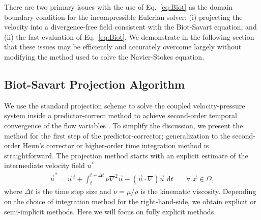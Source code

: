 \documentclass[11pt]{article}
\begin{document}
There are two primary issues with the use of Eq.~\ref{eq:Biot} as the domain boundary condition for the incompressible Eulerian solver: (i) projecting the velocity into a divergence-free field consistent with the Biot-Savart equation, and (ii) the fast evaluation of Eq.~\ref{eq:Biot}. We demonstrate in the following section that these issues may be efficiently and accurately overcome largely without modifying the method used to solve the Navier-Stokes equation.

\subsection{Biot-Savart Projection Algorithm}\label{sec:Biot_projection}

We use the standard projection scheme \cite{Chorin1967} to solve the coupled velocity-pressure system inside a predictor-correct method to achieve second-order temporal convergence of the flow variables \cite{Lauber2022}. 
To simplify the discussion, we present the method for the first step of the predictor-corrector; generalization to the second-order Heun's corrector or higher-order time integration method is straightforward. The projection method starts with an explicit estimate of the intermediate velocity field $u^*$
\begin{align}\label{eq:intermediate}
    \vec{u}^* = \vec{u}\,^t + \int_{t}^{t+\Delta t}\nu\nabla^2\vec{u} -\left(\vec{u}\cdot\nabla\right)\vec{u}\text{ d}t &\quad\forall\ \vec{x}\in\Omega,
\end{align}
where $\Delta t$ is the time step size and $\nu=\mu/\rho$ is the kinematic viscosity. Depending on the choice of integration method for the right-hand-side, we obtain explicit or semi-implicit methods. Here we will focus on fully explicit methods. 


\end{document}
